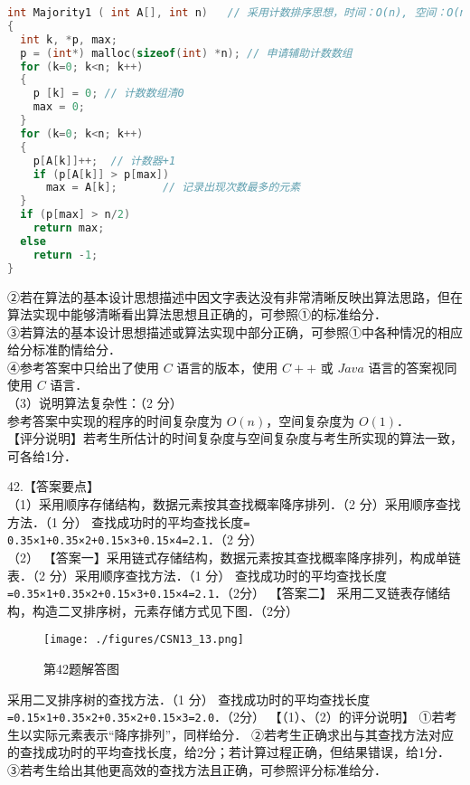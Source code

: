 \begin{lstlisting}[language=cpp]
int Majority1 ( int A[], int n)   // 采用计数排序思想，时间：O(n), 空间：O(n) 
{ 
  int k, *p, max;
  p = (int*) malloc(sizeof(int) *n); // 申请辅助计数数组
  for (k=0; k<n; k++)
  {
    p [k] = 0; // 计数数组清0
    max = 0;
  }
  for (k=0; k<n; k++)
  { 
    p[A[k]]++;  // 计数器+1
    if (p[A[k]] > p[max])
      max = A[k];       // 记录出现次数最多的元素 
  } 
  if (p[max] > n/2)
    return max;
  else
    return -1;
} 
\end{lstlisting}
②若在算法的基本设计思想描述中因文字表达没有非常清晰反映出算法思路，但在算法实现中能够清晰看出算法思想且正确的，可参照①的标准给分． \\
③若算法的基本设计思想描述或算法实现中部分正确，可参照①中各种情况的相应给分标准酌情给分． \\
④参考答案中只给出了使用 $C$ 语言的版本，使用 $C++$ 或 $Java$ 语言的答案视同使用 $C$ 语言． \\
（3）说明算法复杂性：（2 分） \\
参考答案中实现的程序的时间复杂度为 $O(n)$，空间复杂度为 $O(1)$． \\
【评分说明】若考生所估计的时间复杂度与空间复杂度与考生所实现的算法一致，可各给1分．

42.【答案要点】 \\
（1）采用顺序存储结构，数据元素按其查找概率降序排列．（2 分）采用顺序查找方法．（1 分） 
查找成功时的平均查找长度\verb|= 0.35×1+0.35×2+0.15×3+0.15×4=2.1|．（2 分） \\
（2） 【答案一】采用链式存储结构，数据元素按其查找概率降序排列，构成单链表．（2 分）采用顺序查找方法．（1 分） 
查找成功时的平均查找长度\verb|=0.35×1+0.35×2+0.15×3+0.15×4=2.1|．（2分） 
【答案二】 
采用二叉链表存储结构，构造二叉排序树，元素存储方式见下图．（2分）
\begin{figure}[ht]
\centering
\texttt{[image: ./figures/CSN13\_13.png]}
\caption{第42题解答图} \label{CSN13_fig13}
\end{figure}
 采用二叉排序树的查找方法．（1 分） 
查找成功时的平均查找长度\verb|=0.15×1+0.35×2+0.35×2+0.15×3=2.0|．（2分）
【（1）、（2）的评分说明】 
①若考生以实际元素表示“降序排列”，同样给分．
②若考生正确求出与其查找方法对应的查找成功时的平均查找长度，给2分；若计算过程正确，但结果错误，给1分．
③若考生给出其他更高效的查找方法且正确，可参照评分标准给分．

